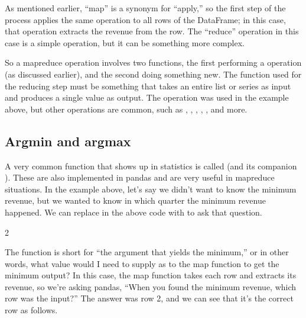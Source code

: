 \documentclass[letterpaper,10pt,english]{sphinxmanual}
\begin{document}
As mentioned earlier, “map” is a synonym for “apply,” so the first step of the process applies the same operation to all rows of the DataFrame; in this case, that operation extracts the revenue from the row.  The “reduce” operation in this case is a simple  operation, but it can be something more complex.

So a map\sphinxhyphen{}reduce operation involves two functions, the first performing a  operation (as discussed earlier), and the second doing something new.  The function used for the reducing step must be something that takes an entire list or series as input and produces a single value as output.  The  operation was used in the example above, but other operations are common, such as , , , , , and more.


\subsection{Argmin and argmax}
\label{\detokenize{chapter-11-processing-rows:argmin-and-argmax}}
A very common function that shows up in statistics is called  (and its companion ).  These are also implemented in pandas and are very useful in map\sphinxhyphen{}reduce situations.  In the example above, let’s say we didn’t want to know the minimum revenue, but we wanted to know in which quarter the minimum revenue happened.  We can replace  in the above code with  to ask that question.

\begin{sphinxVerbatim}[commandchars=\\\{\}]
\PYG{p}{[}\PYG{p}{]}
\end{sphinxVerbatim}

\begin{sphinxVerbatim}[commandchars=\\\{\}]
2
\end{sphinxVerbatim}

The  function is short for “the argument that yields the minimum,” or in other words, what value would I need to supply as  to the map function to get the minimum output?  In this case, the map function takes each row and extracts its revenue, so we’re asking pandas, “When you found the minimum revenue, which row was the input?”  The answer was row 2, and we can see that it’s the correct row as follows.
\end{document}
